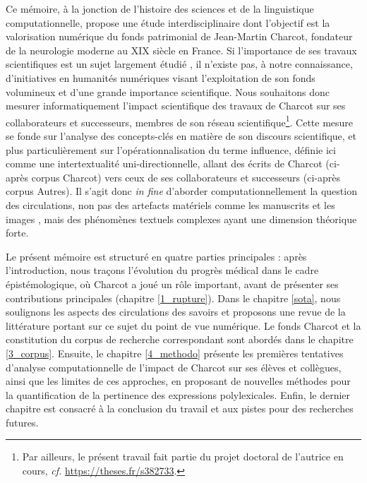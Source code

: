 \label{intro}
Ce mémoire, à la jonction de l'histoire des sciences et de la linguistique computationnelle, propose une étude interdisciplinaire dont l'objectif est la valorisation numérique du fonds patrimonial de Jean-Martin Charcot, fondateur de la neurologie moderne au XIX\ieme{} siècle en France. Si l'importance de ses travaux scientifiques est un sujet largement étudié \citep{bogousslavsky2011following,broussolle2012,camargo2024}, il n'existe pas, à notre connaissance, d'initiatives en humanités numériques visant l'exploitation de son fonds volumineux et d'une grande importance scientifique.
Nous souhaitons donc mesurer informatiquement l'impact scientifique des travaux de Charcot sur ses collaborateurs et successeurs, membres de son réseau scientifique\footnote{Par ailleurs, le présent travail fait partie du projet doctoral de l'autrice en cours, \textit{cf.} \url{https://theses.fr/s382733}.}. Cette mesure se fonde sur l'analyse des concepts-clés en matière de son discours scientifique, et plus particulièrement sur l'opérationnalisation du terme \og{}influence\fg{}, définie ici comme une intertextualité uni-directionnelle, allant des écrits de Charcot (ci-après corpus \og{}Charcot\fg{}) vers ceux de ses collaborateurs et successeurs (ci-après corpus \og{}Autres\fg{}). Il s'agit donc \textit{in fine} d'aborder computationnellement la question des circulations, non pas des artefacts matériels comme les manuscrits \citep{gabay2021katabase} et les images \citep{joyeux2019visual}, mais des phénomènes textuels complexes \citep{manjavacas} ayant une dimension théorique forte.

Le présent mémoire est structuré en quatre parties principales : après l'introduction, nous traçons l'évolution du progrès médical dans le cadre épistémologique, où Charcot a joué un rôle important, avant de présenter ses contributions principales (chapitre \ref{1_rupture}). Dans le chapitre \ref{sota}, nous soulignons les aspects des circulations des savoirs et proposons une revue de la littérature portant sur ce sujet du point de vue numérique. Le fonds Charcot et la constitution du corpus de recherche correspondant sont abordés dans le chapitre \ref{3_corpus}. Ensuite, le chapitre \ref{4_methodo} présente les premières tentatives d'analyse computationnelle de l'impact de Charcot sur ses élèves et collègues, ainsi que les limites de ces approches, en proposant de nouvelles méthodes pour la quantification de la pertinence des expressions polylexicales. Enfin, le dernier chapitre est consacré à la conclusion du travail et aux pistes pour des recherches futures.










